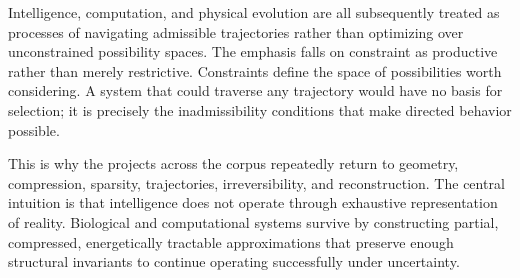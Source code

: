 Intelligence, computation, and physical evolution are all subsequently treated as
processes of navigating admissible trajectories rather than optimizing over unconstrained
possibility spaces. The emphasis falls on constraint as productive rather than merely
restrictive. Constraints define the space of possibilities worth considering. A system
that could traverse any trajectory would have no basis for selection; it is precisely
the inadmissibility conditions that make directed behavior possible.

This is why the projects across the corpus repeatedly return to geometry, compression,
sparsity, trajectories, irreversibility, and reconstruction. The central intuition is
that intelligence does not operate through exhaustive representation of reality.
Biological and computational systems survive by constructing partial, compressed,
energetically tractable approximations that preserve enough structural invariants to
continue operating successfully under uncertainty.
